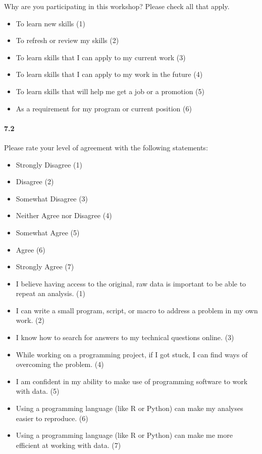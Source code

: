 \documentclass[020-persona\_validation.tex]{subfiles}
\begin{document}
            Why are you participating in this workshop? Please check all that apply.

            \begin{itemize}
                \item To learn new skills  (1)
                \item To refresh or review my skills  (2)
                \item To learn skills that I can apply to my current work  (3)
                \item To learn skills that I can apply to my work in the future  (4)
                \item To learn skills that will help me get a job or a promotion  (5)
                \item As a requirement for my program or current position  (6)
            \end{itemize}

        \paragraph{7.2}

            Please rate your level of agreement with the following statements:

            \begin{itemize}
                \item Strongly Disagree (1)
                \item Disagree (2)
                \item Somewhat Disagree (3)
                \item Neither Agree nor Disagree (4)
                \item Somewhat Agree (5)
                \item Agree (6)
                \item Strongly Agree (7)
            \end{itemize}

            \begin{itemize}
                \item I believe having access to the original, raw data is important to be able to repeat an analysis. (1)
                \item I can write a small program, script, or macro to address a problem in my own work. (2)
                \item I know how to search for answers to my technical questions online. (3)
                \item While working on a programming project, if I got stuck, I can find ways of overcoming the problem. (4)
                \item I am confident in my ability to make use of programming software to work with data. (5)
                \item Using a programming language (like R or Python) can make my analyses easier to reproduce. (6)
                \item Using a programming language (like R or Python) can make me more efficient at working with data. (7)
            \end{itemize}
\end{document}
